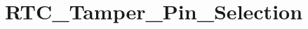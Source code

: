\hypertarget{group___r_t_c___tamper___pin___selection}{\section{R\-T\-C\-\_\-\-Tamper\-\_\-\-Pin\-\_\-\-Selection}
\label{group___r_t_c___tamper___pin___selection}
}
